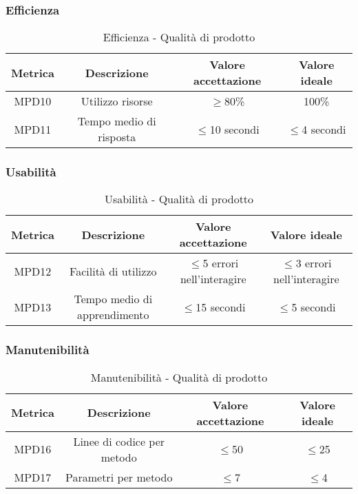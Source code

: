 \documentclass[11pt]{article}
\begin{document}
\begin{justify}
\subsubsection{Efficienza}
\begin{table}[H]
  \centering
\begin{tabular}{|c|c|c|c|}
  \hline
  \textbf{Metrica} & \textbf{Descrizione} & \textbf{Valore accettazione} & \textbf{Valore ideale}\\
  \hline
  MPD10 & Utilizzo risorse & $\geq$80\% & 100\% \\
  \hline
  MPD11 & Tempo medio di risposta & $\leq$10 secondi & $\leq$4 secondi \\
  \hline
\end{tabular}
\caption{Efficienza - Qualità di prodotto}
\label{tab:efficienza}
\end{table}

\subsubsection{Usabilità}
\begin{table}[H]
  \centering
\begin{tabular}{|c|c|c|c|}
  \hline
  \textbf{Metrica} & \textbf{Descrizione} & \textbf{Valore accettazione} & \textbf{Valore ideale}\\
  \hline
  MPD12 & Facilità di utilizzo & $\leq$5 errori nell'interagire & $\leq$3 errori nell'interagire  \\
  \hline
  MPD13 & Tempo medio di apprendimento & $\leq$15 secondi & $\leq$5 secondi \\
  \hline
\end{tabular}
\caption{Usabilità - Qualità di prodotto}
\label{tab:usabilità}
\end{table}

\subsubsection{Manutenibilità}
\begin{table}[H]
  \centering
\begin{tabular}{|c|c|c|c|}
  \hline
  \textbf{Metrica} & \textbf{Descrizione} & \textbf{Valore accettazione} & \textbf{Valore ideale}\\
  \hline
  MPD16 & Linee di codice per metodo & $\leq$50 & $\leq$25 \\
  \hline
  MPD17 & Parametri per metodo & $\leq$7 & $\leq$4 \\
  \hline
\end{tabular}
\caption{Manutenibilità - Qualità di prodotto}
\label{tab:manutenibilità}
\end{table}


\end{justify}
\end{document}
